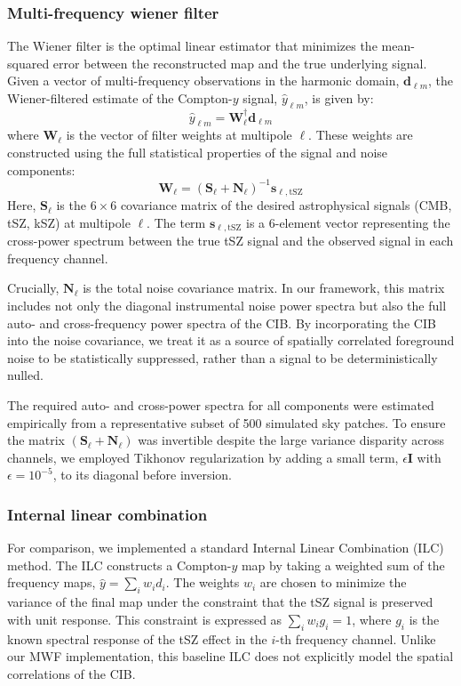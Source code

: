 \documentclass[]{article}
\begin{document}
\subsubsection{Multi-frequency wiener filter}
The Wiener filter is the optimal linear estimator that minimizes the mean-squared error between the reconstructed map and the true underlying signal. Given a vector of multi-frequency observations in the harmonic domain, $\mathbf{d}_{\ell m}$, the Wiener-filtered estimate of the Compton-$y$ signal, $\hat{y}_{\ell m}$, is given by:
\begin{equation}
    \hat{y}_{\ell m} = \mathbf{W}_{\ell}^{\dagger} \mathbf{d}_{\ell m}
\end{equation}
where $\mathbf{W}_{\ell}$ is the vector of filter weights at multipole $\ell$. These weights are constructed using the full statistical properties of the signal and noise components:
\begin{equation}
    \mathbf{W}_{\ell} = \left( \mathbf{S}_{\ell} + \mathbf{N}_{\ell} \right)^{-1} \mathbf{s}_{\ell, \text{tSZ}}
\end{equation}
Here, $\mathbf{S}_{\ell}$ is the $6 \times 6$ covariance matrix of the desired astrophysical signals (CMB, tSZ, kSZ) at multipole $\ell$. The term $\mathbf{s}_{\ell, \text{tSZ}}$ is a 6-element vector representing the cross-power spectrum between the true tSZ signal and the observed signal in each frequency channel.

Crucially, $\mathbf{N}_{\ell}$ is the total noise covariance matrix. In our framework, this matrix includes not only the diagonal instrumental noise power spectra but also the full auto- and cross-frequency power spectra of the CIB. By incorporating the CIB into the noise covariance, we treat it as a source of spatially correlated foreground noise to be statistically suppressed, rather than a signal to be deterministically nulled.

The required auto- and cross-power spectra for all components were estimated empirically from a representative subset of 500 simulated sky patches. To ensure the matrix $(\mathbf{S}_{\ell} + \mathbf{N}_{\ell})$ was invertible despite the large variance disparity across channels, we employed Tikhonov regularization by adding a small term, $\epsilon \mathbf{I}$ with $\epsilon=10^{-5}$, to its diagonal before inversion.

\subsubsection{Internal linear combination}
For comparison, we implemented a standard Internal Linear Combination (ILC) method. The ILC constructs a Compton-$y$ map by taking a weighted sum of the frequency maps, $\hat{y} = \sum_i w_i d_i$. The weights $w_i$ are chosen to minimize the variance of the final map under the constraint that the tSZ signal is preserved with unit response. This constraint is expressed as $\sum_i w_i g_i = 1$, where $g_i$ is the known spectral response of the tSZ effect in the $i$-th frequency channel. Unlike our MWF implementation, this baseline ILC does not explicitly model the spatial correlations of the CIB.
\end{document}
